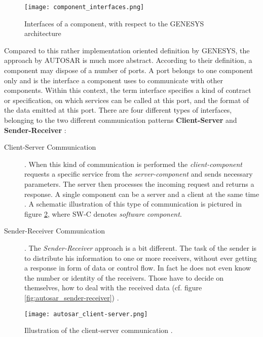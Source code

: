 \begin{figure}[!htbp]
\centering
\texttt{[image: component\_interfaces.png]}
\caption{Interfaces of a component, with respect to the GENESYS architecture \cite[p.40]{genesys}}
\label{fig:component_interfaces}
\end{figure}

Compared to this rather implementation oriented definition by GENESYS, the approach by AUTOSAR is much more abstract. According to their definition, a component may dispose of a number of ports. A port belongs to one component only and is the interface a component uses to communicate with other components. Within this context, the term interface specifies a kind of contract or specification, on which services can be called at this port, and the format of the data emitted at this port. There are four different types of interfaces, belonging to the two different communication patterns \textbf{Client-Server} and \textbf{Sender-Receiver} \cite{autosar_intro}:

\begin{description}
\item [Client-Server Communication].
When this kind of communication is performed the \emph{client-component} requests a specific service from the \emph{server-component} and sends necessary parameters. The server then processes the incoming request and returns a response. A single component can be a server and a client at the same time \cite{autosar_intro}. A schematic illustration of this type of communication is pictured in figure \ref{fig:autosar_client-server}, where SW-C denotes \emph{software component}.

\item [Sender-Receiver Communication].
The \emph{Sender-Receiver} approach is a bit different. The task of the sender is to distribute his information to one or more receivers, without ever getting a response in form of data or control flow. In fact he does not even know the number or identity of the receivers. Those have to decide on themselves, how to deal with the received data (cf. figure \ref{fig:autosar_sender-receiver}) \cite{autosar_intro}.
\end{description}

\begin{figure}[!htbp]
\centering
\texttt{[image: autosar\_client-server.png]}
\caption{Illustration of the client-server communication \cite{autosar_intro}.}
\label{fig:autosar_client-server}
\end{figure}

